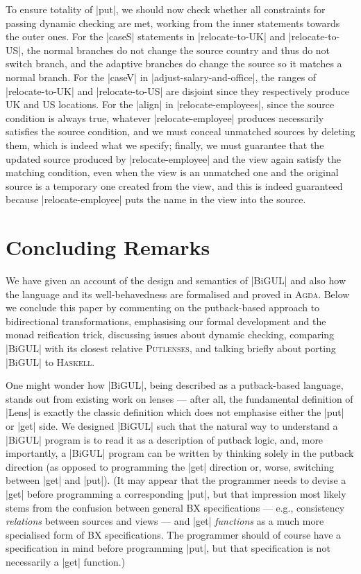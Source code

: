 \documentclass{sigplanconf}
\renewcommand{\emph}{\textsl}
\newcommand{\Putlenses}{\textsc{Putlenses}}
\newcommand{\Agda}{\textsc{Agda}}
\newcommand{\Haskell}{\textsc{Haskell}}
\begin{document}
To ensure totality of |put|, we should now check whether all constraints for passing dynamic checking are met, working from the inner statements towards the outer ones.
For the |caseS| statements in |relocate-to-UK| and |relocate-to-US|, the normal branches do not change the source country and thus do not switch branch, and the adaptive branches do change the source so it matches a normal branch.
For the |caseV| in |adjust-salary-and-office|, the ranges of |relocate-to-UK| and |relocate-to-US| are disjoint since they respectively produce UK and US locations.
For the |align| in |relocate-employees|, since the source condition is always true, whatever |relocate-employee| produces necessarily satisfies the source condition, and we must conceal unmatched sources by deleting them, which is indeed what we specify; finally, we must guarantee that the updated source produced by |relocate-employee| and the view again satisfy the matching condition, even when the view is an unmatched one and the original source is a temporary one created from the view, and this is indeed guaranteed because |relocate-employee| puts the name in the view into the source.


\section{Concluding Remarks}
\label{sec:concluding-remarks}

We have given an account of the design and semantics of |BiGUL| and also how the language and its well-behavedness are formalised and proved in \Agda.
Below we conclude this paper by commenting on the putback-based approach to bidirectional transformations, emphasising our formal development and the monad reification trick, discussing issues about dynamic checking, comparing |BiGUL| with its closest relative \Putlenses, and talking briefly about porting |BiGUL| to \Haskell.

One might wonder how |BiGUL|, being described as a putback-based language, stands out from existing work on lenses ---
after all, the fundamental definition of |Lens| is exactly the classic definition which does not emphasise either the |put| or |get| side.
We designed |BiGUL| such that the natural way to understand a |BiGUL| program is to read it as a description of putback logic, and, more importantly, a |BiGUL| program can be written by thinking solely in the putback direction (as opposed to programming the |get| direction or, worse, switching between |get| and |put|).
(It may appear that the programmer needs to devise a |get| before programming a corresponding |put|, but that impression most likely stems from the confusion between general BX specifications --- e.g., consistency \emph{relations} between sources and views --- and |get| \emph{functions} as a much more specialised form of BX specifications.
The programmer should of course have a specification in mind before programming |put|, but that specification is not necessarily a |get| function.)
\end{document}
